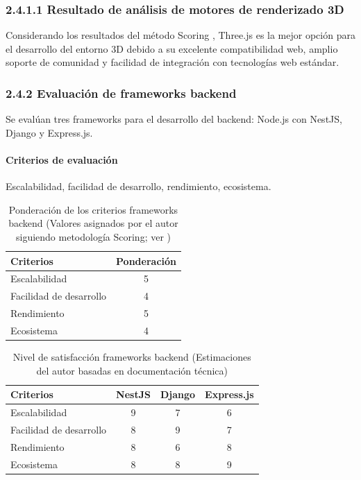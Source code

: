 \subsubsection{2.4.1.1 Resultado de análisis de motores de renderizado 3D}
Considerando los resultados del método Scoring \cite{belton2002}, Three.js \cite{threejs2023} es la mejor opción para el desarrollo del entorno 3D debido a su excelente compatibilidad web, amplio soporte de comunidad y facilidad de integración con tecnologías web estándar.

\subsubsection{2.4.2 Evaluación de frameworks backend}
Se evalúan tres frameworks para el desarrollo del backend: Node.js con NestJS, Django y Express.js.

\paragraph{Criterios de evaluación}
Escalabilidad, facilidad de desarrollo, rendimiento, ecosistema.
\begin{table}[ht]
\centering
\caption{Ponderación de los criterios frameworks backend (Valores asignados por el autor siguiendo metodología Scoring; ver \cite{belton2002})}
\begin{tabular}{l c}
\hline
Criterios & Ponderación \\
\hline
Escalabilidad & 5 \\
Facilidad de desarrollo & 4 \\
Rendimiento & 5 \\
Ecosistema & 4 \\
\hline
\end{tabular}
\end{table}
\FloatBarrier

\begin{table}[ht]
\centering
\caption{Nivel de satisfacción frameworks backend (Estimaciones del autor basadas en documentación técnica)}
\begin{tabular}{l c c c}
\hline
Criterios & NestJS & Django & Express.js \\
\hline
Escalabilidad & 9 & 7 & 6 \\
Facilidad de desarrollo & 8 & 9 & 7 \\
Rendimiento & 8 & 6 & 8 \\
Ecosistema & 8 & 8 & 9 \\
\hline
\end{tabular}
\end{table}
\FloatBarrier

